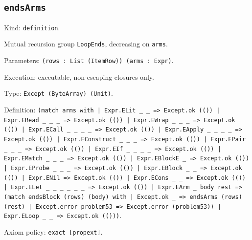 \documentclass[11pt]{article}
\begin{document}
\subsection*{\texttt{endsArms}}
\noindent Kind: \texttt{definition}.\par
\noindent Mutual recursion group \texttt{LoopEnds}, decreasing on \texttt{arms}.\par
\noindent Parameters: \texttt{(rows : List (ItemRow)) (arms : Expr)}.\par
\noindent Execution: executable, non-escaping closures only.\par
\noindent Type: \texttt{Except (ByteArray) (Unit)}.\par
\noindent Definition: \texttt{(match arms with | Expr.ELit \_ \_ => Except.ok (()) | Expr.ERead \_ \_ \_ => Except.ok (()) | Expr.EWrap \_ \_ \_ => Except.ok (()) | Expr.ECall \_ \_ \_ \_ => Except.ok (()) | Expr.EApply \_ \_ \_ \_ => Except.ok (()) | Expr.EConstruct \_ \_ \_ => Except.ok (()) | Expr.EPair \_ \_ \_ => Except.ok (()) | Expr.EIf \_ \_ \_ \_ => Except.ok (()) | Expr.EMatch \_ \_ \_ => Except.ok (()) | Expr.EBlockE \_ => Except.ok (()) | Expr.EProbe \_ \_ \_ => Except.ok (()) | Expr.EBlock \_ \_ => Except.ok (()) | Expr.ENil => Except.ok (()) | Expr.ECons \_ \_ => Except.ok (()) | Expr.ELet \_ \_ \_ \_ \_ \_ => Except.ok (()) | Expr.EArm \_ body rest => (match endsBlock (rows) (body) with | Except.ok \_ => endsArms (rows) (rest) | Except.error problem53 => Except.error (problem53)) | Expr.ELoop \_ \_ => Except.ok (()))}.\par
\noindent Axiom policy: \texttt{exact [propext]}.\par
\end{document}
